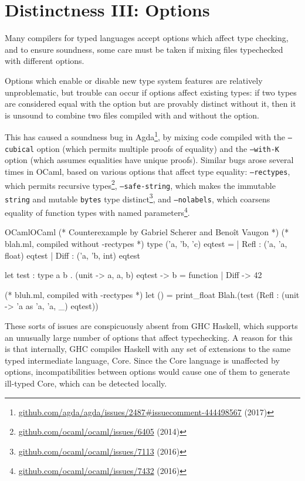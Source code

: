 \documentclass[11pt,oneside]{article}
\newcommand{\code}[1]{\texttt{#1}}
\newenvironment{codegroup}
  {\par\addvspace{\medskipamount}%
   \tcbset{cebox/.append style={before skip=7pt, after skip=7pt}}}
  {\par\addvspace{\medskipamount}}
\begin{document}
\clearpage
\section{Distinctness III: Options}\label{ce:distinctness-options}
Many compilers for typed languages accept options which affect type checking, and to ensure soundness, some care must be taken if mixing files typechecked with different options.

Options which enable or disable new type system features are relatively unproblematic, but trouble can occur if options affect existing types: if two types are considered equal with the option but are provably distinct without it, then it is unsound to combine two files compiled with and without the option.

This has caused a soundness bug in Agda\footnote{\href{https://github.com/agda/agda/issues/2487\#issuecomment-444498567}{github.com/\allowbreak{}agda/\allowbreak{}agda/\allowbreak{}issues/\allowbreak{}2487\#issuecomment-444498567} (2017)}, by mixing code compiled with the \code{--cubical} option (which permits multiple proofs of equality) and the \code{--with-K} option (which assumes equalities have unique proofs). Similar bugs arose several times in OCaml, based on various options that affect type equality: \code{--rectypes}, which permits recursive types\footnote{\href{https://github.com/ocaml/ocaml/issues/6405}{github.com/\allowbreak{}ocaml/\allowbreak{}ocaml/\allowbreak{}issues/\allowbreak{}6405} (2014)}, \code{--safe-string}, which makes the immutable \code{string} and mutable \code{bytes} type distinct\footnote{\href{https://github.com/ocaml/ocaml/issues/7113}{github.com/\allowbreak{}ocaml/\allowbreak{}ocaml/\allowbreak{}issues/\allowbreak{}7113} (2016)}, and \code{--nolabels}, which coarsens equality of function types with named parameters\footnote{\href{https://github.com/ocaml/ocaml/issues/7432}{github.com/\allowbreak{}ocaml/\allowbreak{}ocaml/\allowbreak{}issues/\allowbreak{}7432} (2016)}.

\begin{codegroup}
\begin{codebox}{OCaml}{OCaml}
(* Counterexample by Gabriel Scherer and Benoît Vaugon *)
(* blah.ml, compiled without -rectypes *)
type ('a, 'b, 'c) eqtest =
  | Refl : ('a, 'a, float) eqtest
  | Diff : ('a, 'b, int) eqtest

let test : type a b . (unit -> a, a, b) eqtest -> b = function
  | Diff -> 42

(* bluh.ml, compiled with -rectypes *)
let () =
  print_float Blah.(test (Refl : (unit -> 'a as 'a, 'a, _) eqtest))
\end{codebox}
\end{codegroup}
These sorts of issues are conspicuously absent from GHC Haskell, which supports an unusually large number of options that affect typechecking. A reason for this is that internally, GHC compiles Haskell with any set of extensions to the same typed intermediate language, Core. Since the Core language is unaffected by options, incompatibilities between options would cause one of them to generate ill-typed Core, which can be detected locally.
\end{document}
